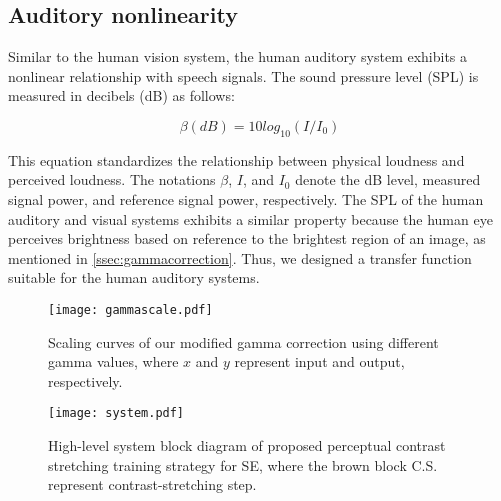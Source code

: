 \documentclass[a4paper]{article}
\begin{document}
\subsection{Auditory nonlinearity}
Similar to the human vision system, the human auditory system exhibits a nonlinear relationship with speech signals. The sound pressure level (SPL) is measured in decibels (dB) as follows:

\begin{equation}
\beta(dB) = 10log_{10}(I/I_{0})
\end{equation}

This equation standardizes the relationship between physical loudness and perceived loudness. The notations $\beta$, $I$, and $I_{0}$ denote the dB level, measured signal power, and reference signal power, respectively. The SPL of the human auditory and visual systems
exhibits a similar property because the human eye perceives brightness based on reference to the brightest region of an image, as mentioned in \ref{ssec:gammacorrection}. Thus, we designed a transfer function suitable for the human auditory systems.


\begin{figure}[h]
 \centering
 \texttt{[image: gammascale.pdf]}
 \caption{Scaling curves of our modified gamma correction using different gamma values, where $x$ and $y$ represent input and output, respectively.}  
 \label{fig:gammascale}
\end{figure}

\begin{figure*}[t]
 \centering
 \texttt{[image: system.pdf]}
 \caption{High-level system block diagram of proposed perceptual contrast stretching training strategy for SE, where the brown block C.S. represent contrast-stretching step.} 
 \label{fig:system}
 \vspace{-0.3cm}
\end{figure*}
\end{document}
